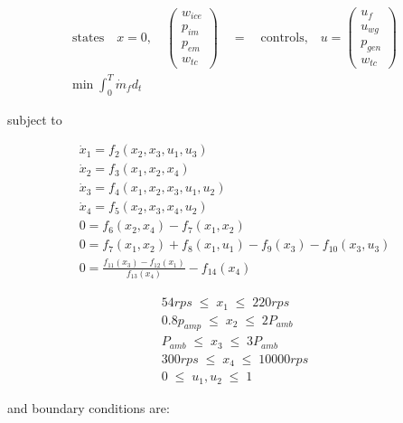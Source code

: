 \begin{equation*}
 \begin{aligned}
	\text{states}\quad x = 0, \quad \begin{pmatrix} w_{ice} \\ p_{im} \\p_{em} \\w_{tc}  \end{pmatrix}\quad = \quad \text{controls,}\quad u = \begin{pmatrix} u_{f} \\ u_{wg} \\p_{gen} \\w_{tc}  \end{pmatrix} \\
	\text{min}\;\int_{0}^{T}\dot{m}{_f} d_t
\end{aligned}
\end{equation*}

subject to

\begin{equation*}
	\begin{aligned}
		\dot{x}_1 = f_2 (x_2,x_3,u_1,u_3 ) \\
		\dot{x}_2= f_3 (x_1,x_2,x_4 ) \\
		\dot{x}_3=f_4 (x_1,x_2,x_3,u_1,u_2 ) \\
		\dot{x}_4=f_5 (x_2,x_3,x_4,u_2 ) \\
		0= f_6 (x_2,x_4 )- f_7 (x_1,x_2 ) \\
		0= f_7(x_1,x_2 ) + f_8 (x_1,u_1 )-f_9 (x_3 )-f_{10}(x_3,u_3 )  \\
		0= \frac{f_{11}(x_3)-f_{12}(x_1 )} {f_{13}(x_4 )}-f_{14} (x_4 )
\end{aligned}
\end{equation*}

\begin{equation*}
	\begin{aligned}
      54 rps \;\leq  \;  x_1  \;\leq \; 220 rps \\
      0.8 p_{amp} \;\leq \;  x_2 \; \leq \; 2P_{amb} \\
      P_{amb} \;  \leq\; x_3 \;\leq \;  3P_{amb} \\
      300rps  \; \leq \; x_4 \;\leq \;   10000 rps \\
      0 \;\leq \;u_1,u_2 \;\leq \; 1
	\end{aligned}
\end{equation*}

and boundary conditions are:

